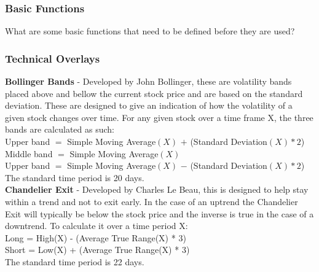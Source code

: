 \documentclass[12pt,a4paper]{article}
\begin{document}
\subsubsection*{Basic Functions}

What are some basic functions that need to be defined before they are used?\\



\iffalse
#################################################################################
\fi

\subsubsection*{Technical Overlays}

\textbf{Bollinger Bands}  - Developed by John Bollinger, these are volatility bands placed above and bellow the current stock price and are based on the standard deviation. These are designed to give an indication of how the volatility of a given stock changes over time. For any given stock over a time frame X, the three bands are calculated as such:\\

Upper band $=$ Simple Moving Average$(X)$ $+$ (Standard Deviation$(X) * 2$)\\
Middle band $=$ Simple Moving Average$(X)$\\
Upper band $=$ Simple Moving Average$(X)$ $-$ (Standard Deviation$(X) * 2$)\\

The standard time period is 20 days.\\

\iffalse
[Visual knowledge discovery and machine learning for investment strategy]
[Bollinger on bollinger bands]
\fi

\textbf{Chandelier Exit} - Developed by Charles Le Beau, this is designed to help stay within a trend and not to exit early. In the case of an uptrend the Chandelier Exit will typically be below the stock price and the inverse is true in the case of a downtrend. To calculate it over a time period X:\\

Long = High(X) - (Average True Range(X) * 3)\\
Short = Low(X) + (Average True Range(X) * 3)\\

The standard time period is 22 days.\\
\end{document}
